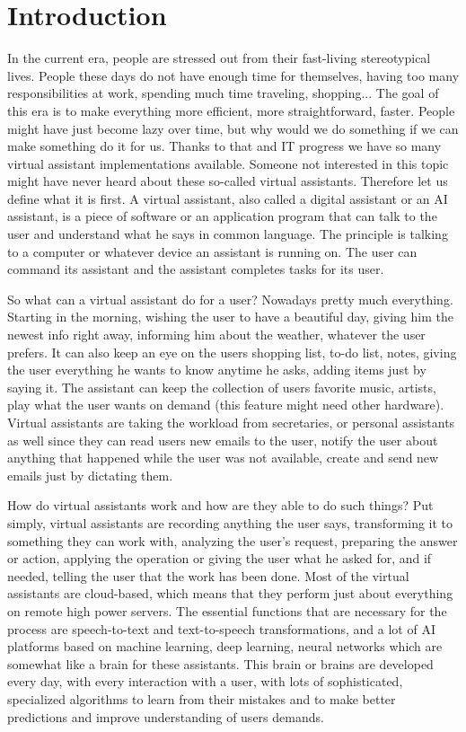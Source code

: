 \documentclass[
  digital, %
  oneside, %
  table,   %
  lof,     %
  lot,     %
]{fithesis3}
\begin{document}
\chapter*{Introduction}
In the current era, people are stressed out from their fast-living stereotypical lives. People these days do not have enough time for themselves, having too many responsibilities at work, spending much time traveling, shopping... The goal of this era is to make everything more efficient, more straightforward, faster. People might have just become lazy over time, but why would we do something if we can make something do it for us. Thanks to that and IT progress we have so many virtual assistant implementations available. Someone not interested in this topic might have never heard about these so-called virtual assistants. Therefore let us define what it is first. A virtual assistant, also called a digital assistant or an AI assistant, is a piece of software or an application program that can talk to the user and understand what he says in common language. The principle is talking to a computer or whatever device an assistant is running on. The user can command its assistant and the assistant completes tasks for its user.

So what can a virtual assistant do for a user? Nowadays pretty much everything. Starting in the morning, wishing the user to have a beautiful day, giving him the newest info right away, informing him about the weather, whatever the user prefers. It can also keep an eye on the users shopping list, to-do list, notes, giving the user everything he wants to know anytime he asks, adding items just by saying it. The assistant can keep the collection of users favorite music, artists, play what the user wants on demand (this feature might need other hardware). Virtual assistants are taking the workload from secretaries, or personal assistants as well since they can read users new emails to the user, notify the user about anything that happened while the user was not available, create and send new emails just by dictating them.

How do virtual assistants work and how are they able to do such things? Put simply, virtual assistants are recording anything the user says, transforming it to something they can work with, analyzing the user's request, preparing the answer or action, applying the operation or giving the user what he asked for, and if needed, telling the user that the work has been done. Most of the virtual assistants are cloud-based, which means that they perform just about everything on remote high power servers. The essential functions that are necessary for the process are speech-to-text and text-to-speech transformations, and a lot of AI platforms based on machine learning, deep learning, neural networks which are somewhat like a brain for these assistants. This brain or brains are developed every day, with every interaction with a user, with lots of sophisticated, specialized algorithms to learn from their mistakes and to make better predictions and improve understanding of users demands.
\end{document}
